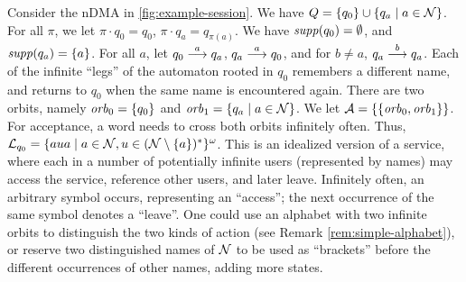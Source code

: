\begin{example}\label{exa:session}
 Consider the nDMA in \cref{fig:example-session}. We have $Q = \{q_0\} \cup \{q_a \mid a \in \mathcal{N}\}$. For all $\pi$, we let $\pi \cdot q_0 = q_0$, $\pi \cdot q_a = q_{\pi(a)}$. We have $\mathit{supp}(q_0) = \emptyset$, and $\mathit{supp}(q_a) = \{ a \}$. For all $a$, let $q_0 \overset{a}{\longrightarrow} q_a$, $q_a \overset{a}{\longrightarrow} q_0$, and for $b \neq a$, $q_a \overset{b}{\longrightarrow} q_a$. Each of the infinite ``legs'' of the automaton rooted in $q_0$ remembers a different name, and returns to $q_0$ when the same name is encountered again. There are two orbits, namely $\mathit{orb}_0 = \{ q_0 \}$ and $\mathit{orb}_1 = \{ q_a \mid a \in \mathcal{N} \}$. We let $\mathcal{A} = \{ \{ \mathit{orb}_0, \mathit{orb}_1 \} \}$. For acceptance, a word needs to cross both orbits infinitely often. Thus, $\mathcal{L}_{q_0}=\{aua \mid a \in \mathcal{N}, u \in (\mathcal{N}\setminus\{a\})^* \}^\omega$.
% 
This is an idealized version of a service, where each in a number of potentially infinite users (represented by names) may access the service, reference other users, and later leave. Infinitely often, an arbitrary symbol occurs, representing an ``access''; the next occurrence of the same symbol denotes a ``leave''. One could use an  alphabet with two infinite orbits to distinguish the two kinds of action (see Remark \ref{rem:simple-alphabet}), or reserve two distinguished names of $\mathcal{N}$ to be used as ``brackets'' 	
 before the different occurrences of other names, adding more states.
\end{example}

